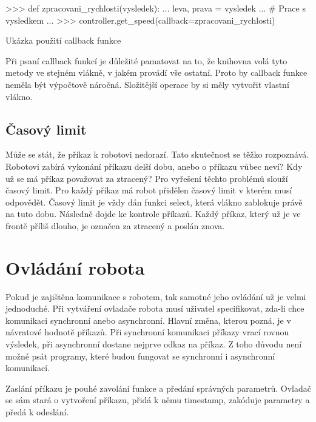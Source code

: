 \documentclass[12pt,notitlepage]{report}
\begin{document}
    \begin{listing}
    \begin{pyc}
>>> def zpracovani_rychlosti(vysledek):
...    leva, prava = vysledek
...    # Prace s vysledkem
...
>>> controller.get_speed(callback=zpracovani_rychlosti)
    \end{pyc}
    \caption{Ukázka použití callback funkce}
    \label{lst:callback}
    \end{listing}

    Při psaní callback funkcí je důležité pamatovat na to, že knihovna volá
    tyto metody ve stejném vlákně, v jakém provádí vše ostatní. Proto by
    callback funkce neměla být výpočtově náročná. Složitější operace by si měly
    vytvořit vlastní vlákno.

    \subsection{Časový limit}

    Může se stát, že příkaz k robotovi nedorazí. Tato skutečnost se těžko
    rozpoznává. Robotovi zabírá vykonání příkazu delší dobu, anebo o příkazu
    vůbec neví? Kdy už se má příkaz považovat za ztracený? Pro vyřešení těchto
    problémů slouží časový limit. Pro každý příkaz má robot přidělen časový
    limit v kterém musí odpovědět. Časový limit je vždy dán funkci select,
    která vlákno zablokuje právě na tuto dobu. Následně dojde ke kontrole
    příkazů. Každý příkaz, který už je ve frontě příliš dlouho, je označen za
    ztracený a poslán znova.

    \section{Ovládání robota}
    \label{controller}

    Pokud je zajištěna komunikace s robotem, tak samotné jeho ovládání už je
    velmi jednoduché. Při vytváření ovladače robota musí uživatel specifikovat,
    zda-li chce komunikaci synchronní anebo asynchronní. Hlavní změna, kterou
    pozná, je v návratové hodnotě příkazů. Při synchronní komunikaci příkazy
    vrací rovnou výsledek, při asynchronní dostane nejprve odkaz na příkaz. Z
    toho důvodu není možné psát programy, které budou fungovat se synchronní i
    asynchronní komunikací.

    Zaslání příkazu je pouhé zavolání funkce a předání správných parametrů.
    Ovladač se sám stará o vytvoření příkazu, přidá k němu timestamp, zakóduje
    parametry a předá k odeslání.
\end{document}
